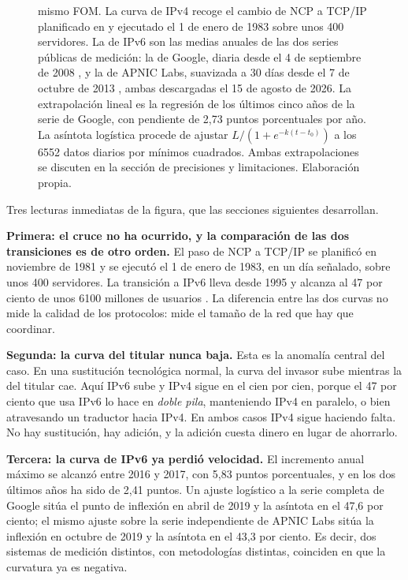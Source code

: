 \documentclass[11pt,letterpaper]{article}
\begin{document}
\begin{figure}[ht]
{  mismo FOM. La curva de IPv4 recoge el cambio de NCP a TCP/IP planificado en
  \textcite{rfc801} y ejecutado el 1 de enero de 1983 sobre unos 400 servidores.
  La de IPv6 son las medias anuales de las dos series públicas de medición: la
  de Google, diaria desde el 4 de septiembre de 2008 \parencite{googlev6}, y la
  de APNIC Labs, suavizada a 30 días desde el 7 de octubre de 2013
  \parencite{apnicv6}, ambas descargadas el 15 de agosto de 2026. La
  extrapolación lineal es la regresión de los últimos cinco años de la serie de
  Google, con pendiente de 2,73 puntos porcentuales por año. La asíntota
  logística procede de ajustar $L/(1+e^{-k(t-t_0)})$ a los \num{6552} datos
  diarios por mínimos cuadrados. Ambas extrapolaciones se discuten en la
  sección de precisiones y limitaciones. Elaboración propia.}
  \label{fig:curvas}
\end{figure}

Tres lecturas inmediatas de la figura, que las secciones siguientes desarrollan.

\textbf{Primera: el cruce no ha ocurrido, y la comparación de las dos
transiciones es de otro orden.} El paso de NCP a TCP/IP se planificó en noviembre
de 1981 \parencite{rfc801} y se ejecutó el 1 de enero de 1983, en un día
señalado, sobre unos 400 servidores. La transición a IPv6 lleva desde 1995 y
alcanza al 47 por ciento de unos \num{6100} millones de usuarios
\parencite{itu2025}. La diferencia entre las dos curvas no mide la calidad de los
protocolos: mide el tamaño de la red que hay que coordinar.

\textbf{Segunda: la curva del titular nunca baja.} Esta es la anomalía central
del caso. En una sustitución tecnológica normal, la curva del invasor sube
mientras la del titular cae. Aquí IPv6 sube y IPv4 sigue en el cien por cien,
porque el 47 por ciento que usa IPv6 lo hace en \emph{doble pila}, manteniendo
IPv4 en paralelo, o bien atravesando un traductor hacia IPv4. En ambos casos IPv4
sigue haciendo falta. No hay sustitución, hay adición, y la adición cuesta dinero
en lugar de ahorrarlo.

\textbf{Tercera: la curva de IPv6 ya perdió velocidad.} El incremento anual
máximo se alcanzó entre 2016 y 2017, con 5,83 puntos porcentuales, y en los dos
últimos años ha sido de 2,41 puntos. Un ajuste logístico a la serie completa de
Google sitúa el punto de inflexión en abril de 2019 y la asíntota en el 47,6 por
ciento; el mismo ajuste sobre la serie independiente de APNIC Labs sitúa la
inflexión en octubre de 2019 y la asíntota en el 43,3 por ciento. Es decir, dos
sistemas de medición distintos, con metodologías distintas, coinciden en que la
curvatura ya es negativa.
\end{document}
